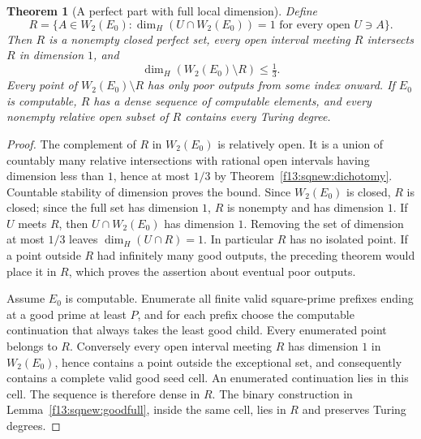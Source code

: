 \documentclass[11pt,a4paper]{article}
\newtheorem{theorem}{Theorem}[section]
\theoremstyle{definition}
\theoremstyle{remark}
\numberwithin{equation}{section}
\begin{document}
\begin{theorem}[A perfect part with full local dimension]
\label{f13:sqnew:regularpart}
Define
\[
 R=\{A\in W_2(E_0):
       \dim_H(U\cap W_2(E_0))=1\text{ for every open }U\ni A\}.
\]
Then $R$ is a nonempty closed perfect set, every open interval meeting
$R$ intersects $R$ in dimension $1$, and
\[
 \dim_H(W_2(E_0)\setminus R)\le\tfrac13.
\]
Every point of $W_2(E_0)\setminus R$ has only poor outputs from some
index onward.
If $E_0$ is computable, $R$ has a dense sequence of computable elements,
and every nonempty relative open subset of $R$ contains every Turing degree.
\end{theorem}
\begin{proof}
The complement of $R$ in $W_2(E_0)$ is relatively open. It is a union
of countably many relative intersections with rational open intervals
having dimension less than $1$, hence at most $1/3$ by
Theorem~\ref{f13:sqnew:dichotomy}. Countable stability of dimension proves
the bound. Since $W_2(E_0)$ is closed, $R$ is closed; since the full set
has dimension $1$, $R$ is nonempty and has dimension $1$.
If $U$ meets $R$, then $U\cap W_2(E_0)$ has dimension $1$. Removing the
set of dimension at most $1/3$ leaves $\dim_H(U\cap R)=1$.
In particular $R$ has no isolated point. If a point outside $R$ had
infinitely many good outputs, the preceding theorem would place it in
$R$, which proves the assertion about eventual poor outputs.

Assume $E_0$ is computable. Enumerate all finite valid square-prime
prefixes ending at a good prime at least $P$, and for each prefix choose
the computable continuation that always takes the least good child.
Every enumerated point belongs to $R$. Conversely every open interval
meeting $R$ has dimension $1$ in $W_2(E_0)$, hence contains a point
outside the exceptional set, and consequently contains a complete valid
good seed cell. An enumerated continuation lies in this cell. The
sequence is therefore dense in $R$. The binary construction in
Lemma~\ref{f13:sqnew:goodfull}, inside the same cell, lies in $R$ and
preserves Turing degrees.
\end{proof}
\end{document}
